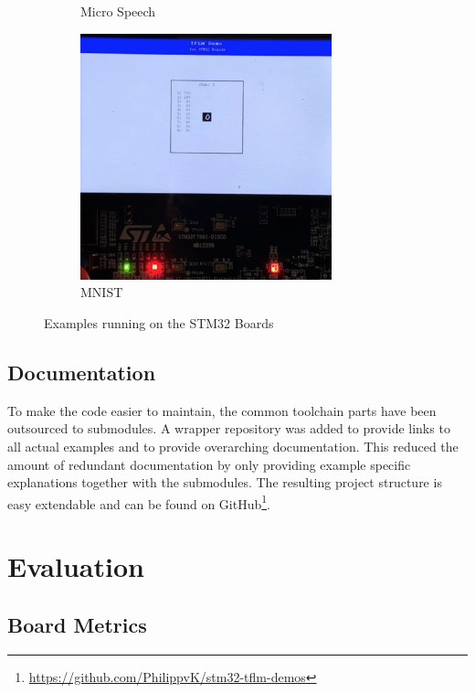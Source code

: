 \documentclass[oneside]{tum-book}
\begin{document}
\begin{figure}[h]
\begin{subfigure}[b]{0.3\textwidth}
         \caption{Micro Speech}
         \label{fig:gif_mirco_speech}
     \end{subfigure}
     \hfill
     \begin{subfigure}[b]{0.3\textwidth}
         \centering
         \includegraphics[width=0.8\textwidth]{figures/mnist_gif.png}
         \caption{MNIST}
         \label{fig:gif_mnist}
     \end{subfigure}
        \caption{Examples running on the STM32 Boards}
        \label{fig:gifs}
\end{figure}

\section{Documentation}

To make the code easier to maintain, the common toolchain parts have been outsourced to submodules. A wrapper repository was added to provide links to all actual examples and to provide overarching documentation. This reduced the amount of redundant documentation by only providing example specific explanations together with the submodules. The resulting project structure is easy extendable and can be found on GitHub\footnote{\url{https://github.com/PhilippvK/stm32-tflm-demos}}.

\chapter{Evaluation}



\section{Board Metrics}
\end{document}
